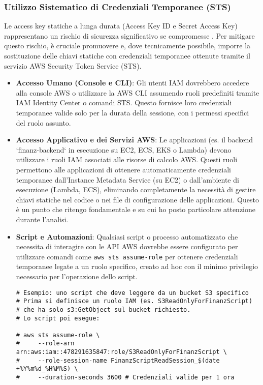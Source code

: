 \subsubsection{Utilizzo Sistematico di Credenziali Temporanee (STS)}
Le access key statiche a lunga durata (Access Key ID e Secret Access Key) rappresentano un rischio di sicurezza significativo se compromesse \cite{kazi:leastprivilege}. Per mitigare questo rischio, è cruciale promuovere e, dove tecnicamente possibile, imporre la sostituzione delle chiavi statiche con credenziali temporanee ottenute tramite il servizio AWS Security Token Service (STS).
\begin{itemize}
    \item \textbf{Accesso Umano (Console e CLI)}: Gli utenti IAM dovrebbero accedere alla console AWS o utilizzare la AWS CLI assumendo ruoli predefiniti tramite IAM Identity Center o comandi STS. Questo fornisce loro credenziali temporanee valide solo per la durata della sessione, con i permessi specifici del ruolo assunto.
    \item \textbf{Accesso Applicativo e dei Servizi AWS}: Le applicazioni (es. il backend `finanz-backend` in esecuzione su EC2, ECS, EKS o Lambda) devono utilizzare i ruoli IAM associati alle risorse di calcolo AWS. Questi ruoli permettono alle applicazioni di ottenere automaticamente credenziali temporanee dall'Instance Metadata Service (su EC2) o dall'ambiente di esecuzione (Lambda, ECS), eliminando completamente la necessità di gestire chiavi statiche nel codice o nei file di configurazione delle applicazioni. Questo è un punto che ritengo fondamentale e su cui ho posto particolare attenzione durante l'analisi.
    \item \textbf{Script e Automazioni}: Qualsiasi script o processo automatizzato che necessita di interagire con le API AWS dovrebbe essere configurato per utilizzare comandi come \texttt{aws sts assume-role} per ottenere credenziali temporanee legate a un ruolo specifico, creato ad hoc con il minimo privilegio necessario per l'operazione dello script.
    \begin{lstlisting}[style=bash, caption={Ottenere credenziali temporanee tramite STS AssumeRole per uno script}, label=lst:sts-assume-role-iam]
# Esempio: uno script che deve leggere da un bucket S3 specifico
# Prima si definisce un ruolo IAM (es. S3ReadOnlyForFinanzScript) 
# che ha solo s3:GetObject sul bucket richiesto.
# Lo script poi esegue:

# aws sts assume-role \
#     --role-arn arn:aws:iam::478291635847:role/S3ReadOnlyForFinanzScript \
#     --role-session-name FinanzScriptReadSession_$(date +%Y%m%d_%H%M%S) \
#     --duration-seconds 3600 # Credenziali valide per 1 ora


\end{lstlisting}
\end{itemize}
